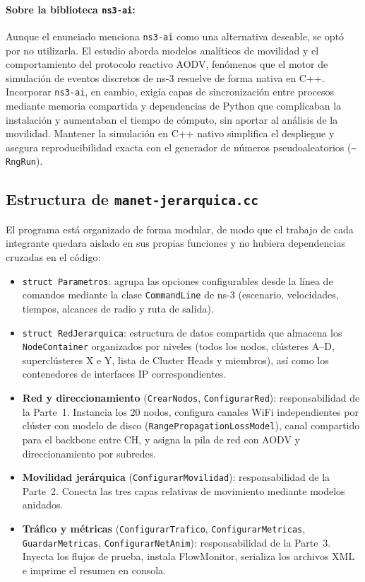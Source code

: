 \paragraph{Sobre la biblioteca \texttt{ns3-ai}:}
Aunque el enunciado menciona \texttt{ns3-ai} como una alternativa deseable, se optó por no utilizarla. El estudio aborda modelos analíticos de movilidad y el comportamiento del protocolo reactivo AODV, fenómenos que el motor de simulación de eventos discretos de ns-3 resuelve de forma nativa en C++. Incorporar \texttt{ns3-ai}, en cambio, exigía capas de sincronización entre procesos mediante memoria compartida y dependencias de Python que complicaban la instalación y aumentaban el tiempo de cómputo, sin aportar al análisis de la movilidad. Mantener la simulación en C++ nativo simplifica el despliegue y asegura reproducibilidad exacta con el generador de números pseudoaleatorios (\texttt{--RngRun}).

\subsection{Estructura de \texttt{manet-jerarquica.cc}}

El programa está organizado de forma modular, de modo que el trabajo de cada integrante quedara aislado en sus propias funciones y no hubiera dependencias cruzadas en el código:

\begin{itemize}
    \item \texttt{struct Parametros}: agrupa las opciones configurables desde la línea de comandos mediante la clase \texttt{CommandLine} de ns-3 (escenario, velocidades, tiempos, alcances de radio y ruta de salida).
    \item \texttt{struct RedJerarquica}: estructura de datos compartida que almacena los \texttt{NodeContainer} organizados por niveles (todos los nodos, clústeres A--D, superclústeres X e Y, lista de Cluster Heads y miembros), así como los contenedores de interfaces IP correspondientes.
    \item \textbf{Red y direccionamiento} (\texttt{CrearNodos}, \texttt{ConfigurarRed}): responsabilidad de la Parte~1. Instancia los 20 nodos, configura canales WiFi independientes por clúster con modelo de disco (\texttt{RangePropagationLossModel}), canal compartido para el backbone entre CH, y asigna la pila de red con AODV y direccionamiento por subredes.
    \item \textbf{Movilidad jerárquica} (\texttt{ConfigurarMovilidad}): responsabilidad de la Parte~2. Conecta las tres capas relativas de movimiento mediante modelos anidados.
    \item \textbf{Tráfico y métricas} (\texttt{ConfigurarTrafico}, \texttt{ConfigurarMetricas}, \texttt{GuardarMetricas}, \texttt{ConfigurarNetAnim}): responsabilidad de la Parte~3. Inyecta los flujos de prueba, instala FlowMonitor, serializa los archivos XML e imprime el resumen en consola.
\end{itemize}

